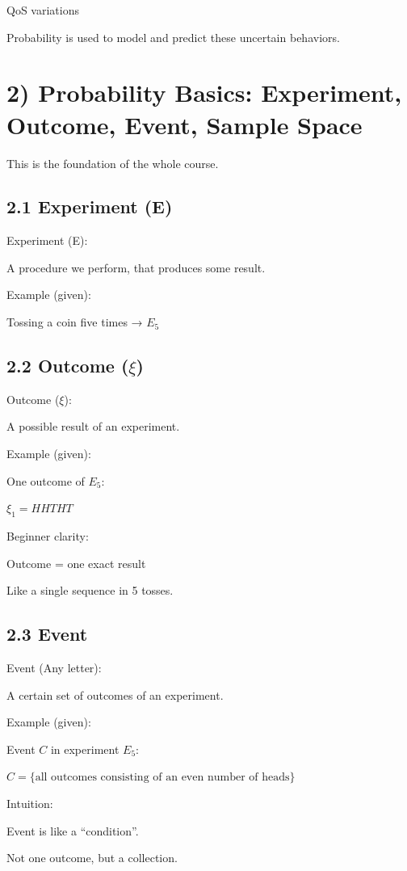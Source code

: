 \documentclass[12pt,a4paper]{article}
\begin{document}
QoS variations

Probability is used to model and predict these uncertain behaviors.

\section*{2) Probability Basics: Experiment, Outcome, Event, Sample Space}

This is the foundation of the whole course.

\subsection*{2.1 Experiment (E)}

Experiment (E):

A procedure we perform, that produces some result.

Example (given):

Tossing a coin five times → $E_5$

\subsection*{2.2 Outcome ($\xi$)}

Outcome ($\xi$):

A possible result of an experiment.

Example (given):

One outcome of $E_5$:

$\xi_1 = HHTHT$

Beginner clarity:

Outcome = one exact result

Like a single sequence in 5 tosses.

\subsection*{2.3 Event}

Event (Any letter):

A certain set of outcomes of an experiment.

Example (given):

Event $C$ in experiment $E_5$:

$C = \{ \text{all outcomes consisting of an even number of heads} \}$

Intuition:

Event is like a “condition”.

Not one outcome, but a collection.
\end{document}

